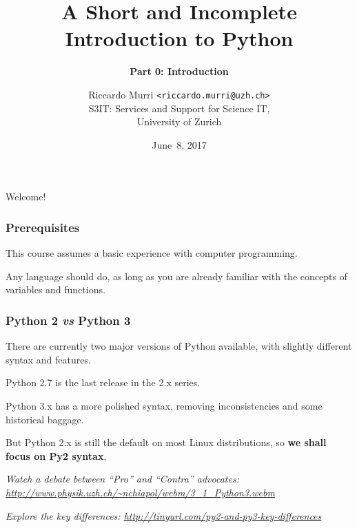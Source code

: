 \documentclass[english,serif,mathserif,xcolor=pdftex,dvipsnames,table]{beamer}
\title[Introduction to Python]{%
  A Short and Incomplete Introduction to Python
}
\subtitle{\bfseries Part 0: Introduction}
\author[R.~Murri]{%
  Riccardo Murri \texttt{<riccardo.murri@uzh.ch>}
  \\
  S3IT: Services and Support for Science IT,
  \\
  University of Zurich
}
\date{June~8, 2017}
\begin{document}
\maketitle

\begin{frame}
  \begin{center}
    {\Huge Welcome!}
  \end{center}
\end{frame}







\begin{frame}
  \frametitle{Prerequisites}
  This course assumes a basic experience with computer programming.

  \+
  Any language should do, as long as you are already familiar with
  the concepts of variables and functions.
\end{frame}


\begin{frame}[fragile]
  \frametitle{Python 2 \emph{vs} Python 3}

  There are currently two major versions of Python available, with
  slightly different syntax and features.

  \+
  Python 2.7 is the last release in the 2.x series.

  \+
  Python 3.x has a more polished syntax, removing inconsistencies and
  some historical baggage.

  \+
  But Python 2.x is still the default on most Linux distributions, so
  \textbf{we shall focus on Py2 syntax}.

  \+
  {\footnotesize\em
    Watch a debate between ``Pro'' and ``Contra'' advocates:
    \url{http://www.physik.uzh.ch/~nchiapol/webm/3_1_Python3.webm}}

  \+
  {\footnotesize\em
    Explore the key differences:
    \url{http://tinyurl.com/py2-and-py3-key-differences}}
\end{frame}
\end{document}
